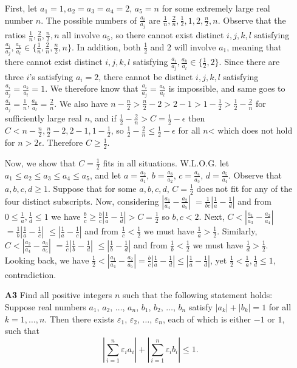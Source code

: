 \documentclass[11pt,a4paper]{article}
\begin{document}
\begin{itemize}
First, let $a_1=1, a_2=a_3=a_4=2$, $a_5=n$ for some extremely large real number $n$. 
The possible numbers of $\frac {a_i}{a_j}$ are $\frac 1n, \frac 2n, \frac 12, 1, 2, \frac n2, n$. 
Observe that the ratios $\frac 1n, \frac 2n, \frac n2, n$ all involve $a_5$, so there cannot exist distinct $i, j, k, l$ satisfying 
$\frac{a_i}{a_j}, \frac {a_k}{a_l}\in\{\frac 1n, \frac 2n, \frac n2, n\}$. 
In addition, both $\frac 12$ and 2 will involve $a_1$, meaning that there cannot exist distinct $i, j, k, l$ satisfying 
$\frac{a_i}{a_j}, \frac {a_k}{a_l}\in\{\frac 12, 2\}$. 
Since there are three $i$'s satisfying $a_i=2$, there cannot be distinct $i,j,k,l$ satisfying $\frac{a_i}{a_j}=\frac {a_k}{a_l}=1$. 
We therefore know that  $\frac{a_i}{a_j}=\frac {a_k}{a_l}$ is impossible, 
and same goes to $\frac{a_i}{a_j}=\frac 1n, \frac {a_k}{a_l}=\frac 2n$. 
We also have $n-\frac n2> \frac n2 -2 > 2-1>1-\frac 12>\frac 12-\frac 2n$ for sufficiently large real $n$, 
and if $\frac 12-\frac 2n > C=\frac 12-\epsilon$ then $C<n-\frac n2, \frac n2 -2, 2-1, 1-\frac 12$, 
so $\frac 12-\frac 2n\le \frac 12-\epsilon$ for all $n$< which does not hold for $n > 2\epsilon$. 
Therefore $C\ge \frac 12$. 

Now, we show that $C=\frac 12$ fits in all situations. 
W.L.O.G. let $a_1\le a_2\le a_3\le a_4\le a_5$, and let $a=\frac {a_2}{a_1}$, 
$b=\frac {a_3}{a_2}$, 
$c=\frac {a_4}{a_3}$, 
$d=\frac {a_5}{a_4}$. 
Observe that $a, b, c, d\ge 1$. 
Suppose that for some $a,b,c,d$, $C=\frac 12$ does not fit for any of the four distinct subscripts. 
Now, considering $|\frac {a_1}{a_4}-\frac {a_2}{a_5}|$
$=\frac 1{bc}|\frac 1a-\frac 1d|$
and from $0\le \frac 1a, \frac 1d\le 1$
we have $\frac bc\ge \frac bc|\frac 1a-\frac 1d|>C=\frac 12$
so $b, c<2$. 
Next, $C<|\frac {a_1}{a_3}-\frac {a_2}{a_4}|$
$=\frac 1b|\frac 1a-\frac 1c|$
$\le |\frac 1a-\frac 1c|$
and from $\frac 1c<\frac 12$ we must have $\frac 1a>\frac 12$. 
Similarly, $C<|\frac {a_2}{a_4}-\frac {a_3}{a_5}|$
$=\frac 1c|\frac 1b-\frac 1d|$
$\le |\frac 1b-\frac 1d|$
and from $\frac 1b<\frac 12$ we must have $\frac 1d>\frac 12$. 
Looking back, we have $\frac 12<|\frac {a_1}{a_4}-\frac {a_2}{a_5}|=\frac bc|\frac 1a-\frac 1d|\le|\frac 1a-\frac 1d|$, 
yet $\frac 12<\frac 1a , \frac 1d\le 1$, contradiction.

\newpage
\item[\textbf{A3}]
Find all positive integers $n$ such that the following statement holds: Suppose real numbers $a_1$, $a_2$, $\dots$, $a_n$, $b_1$, $b_2$, $\dots$, $b_n$ satisfy $|a_k|+|b_k|=1$ for all $k=1,\dots,n$. Then there exists $\varepsilon_1$, $\varepsilon_2$, $\dots$, $\varepsilon_n$, each of which is either $-1$ or $1$, such that
\[ \left| \sum_{i=1}^n \varepsilon_i a_i \right| + \left| \sum_{i=1}^n \varepsilon_i b_i \right| \le 1. \]


\end{itemize}
\end{document}
